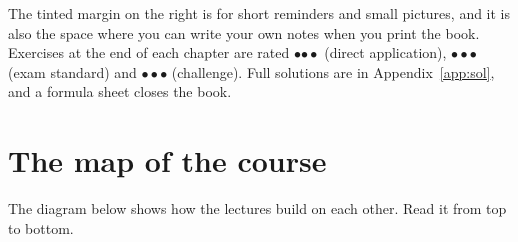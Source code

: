 The tinted margin on the right is for short reminders and small pictures, and it is
also the space where you can write your own notes when you print the book. Exercises at
the end of each chapter are rated
{\color{accent}$\bullet$}{\color{primarygrid}$\bullet\bullet$} (direct application),
{\color{accent}$\bullet\bullet$}{\color{primarygrid}$\bullet$} (exam standard) and
{\color{accent}$\bullet\bullet\bullet$} (challenge). Full solutions are in
Appendix~\ref{app:sol}, and a formula sheet closes the book.

\clearpage
\section*{The map of the course}

The diagram below shows how the lectures build on each other. Read it from top to bottom.

